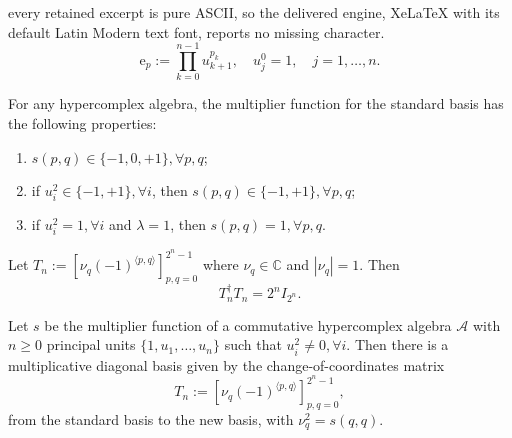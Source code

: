 \documentclass[10pt,a4paper]{amsart}
\begin{document}
every retained excerpt is pure ASCII, so the delivered engine, XeLaTeX with its default Latin Modern text font, reports no missing character.
\begin{equation}
    \label{XOR algebra : binary representation}
    \mathrm e_p := \prod_{k=0}^{n-1} u_{k+1}^{p_k}, \quad u_j^0 = 1, \quad j = 1,\ldots,n.
\end{equation}

\begin{proposition}
    \label{XOR algebra : values of s}
    For any hypercomplex algebra, the multiplier function for the standard basis has the following properties:
    \begin{enumerate}
        \item $s(p,q) \in \{ -1,0,+1 \}, \forall p,q$;
        \item if $u_i^2 \in \{ -1,+1 \}, \forall i$, then $s(p,q) \in \{ -1, +1 \}, \forall p,q$;
        \item if $u_i^2 =1, \forall i$ and $\lambda=1$, then $s(p,q) =1, \forall p,q$.
    \end{enumerate}
\end{proposition}

\begin{proposition}
    \label{hadamard-solution matrix def and properties}
    Let $T_n := [\nu_q (-1)^{\langle p,q\rangle}]_{p,q=0}^{2^n-1}$ where $\nu_q \in \mathbb{C}$ and $|\nu_q| = 1$. Then
    $$ T_n^{\dagger} T_n = 2^n I_{2^n}. $$
\end{proposition}

\begin{theorem}
    \label{theorem : algorithm-like diagonal basis}
    Let $s$ be the multiplier function of a commutative hypercomplex algebra $\mathcal{A}$ with $n \geq 0$ principal units $\{1,u_1, \ldots,u_n\}$ such that $u_i^2 \neq 0, \forall i$. Then there is a multiplicative diagonal basis given by the change-of-coordinates matrix
    $$ T_n := [\nu_q (-1)^{\langle p,q\rangle}]_{p,q=0}^{2^n-1}, $$
    from the standard basis to the new basis, with $\nu_q^2 = s(q,q)$.
\end{theorem}
\end{document}
